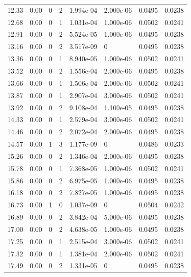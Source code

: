 \documentclass[preview]{standalone}
\begin{document}
{{{\begin{tabular}{L{1.2cm}C{1.2cm} C{0.3cm}C{0.5cm} C{1.4cm}C{1.4cm} C{1.4cm}C{1.4cm}}
  12.33  &  0.00  & 0     &  2 &  1.994e-04  & 2.000e-06  & 0.0495 &  0.0238   \\ 
  12.68  &  0.00  & 0     &  1 &  1.031e-04  & 1.000e-06  & 0.0502 &  0.0241   \\ 
  12.91  &  0.00  & 0     &  2 &  5.524e-05  & 1.000e-06  & 0.0495 &  0.0238   \\ 
  13.16  &  0.00  & 0     &  2 &  3.517e-09  & 0  & 0.0495 &  0.0238   \\ 
  13.36  &  0.00  & 0     &  1 &  8.940e-05  & 1.000e-06  & 0.0502 &  0.0241   \\ 
  13.52  &  0.00  & 0     &  2 &  1.556e-04  & 2.000e-06  & 0.0495 &  0.0238   \\ 
  13.66  &  0.00  & 0     &  1 &  1.506e-04  & 2.000e-06  & 0.0502 &  0.0241   \\ 
  13.87  &  0.00  & 0     &  1 &  2.907e-04  & 3.000e-06  & 0.0502 &  0.0241   \\ 
  13.92  &  0.00  & 0     &  2 &  9.108e-04  & 1.100e-05  & 0.0495 &  0.0238   \\ 
  14.33  &  0.00  & 0     &  1 &  2.579e-04  & 3.000e-06  & 0.0502 &  0.0241   \\ 
  14.46  &  0.00  & 0     &  2 &  2.072e-04  & 2.000e-06  & 0.0495 &  0.0238   \\ 
  14.57  &  0.00  & 1     &  3 &  1.177e-09  & 0  & 0.0486 &  0.0233   \\ 
  15.26  &  0.00  & 0     &  2 &  1.346e-04  & 2.000e-06  & 0.0495 &  0.0238   \\ 
  15.78  &  0.00  & 0     &  1 &  7.368e-05  & 1.000e-06  & 0.0502 &  0.0241   \\ 
  15.86  &  0.00  & 0     &  2 &  6.975e-05  & 1.000e-06  & 0.0495 &  0.0238   \\ 
  16.18  &  0.00  & 0     &  2 &  7.827e-05  & 1.000e-06  & 0.0495 &  0.0238   \\ 
  16.73  &  0.00  & 1     &  0 &  1.037e-09  & 0  & 0.0504 &  0.0242   \\ 
  16.89  &  0.00  & 0     &  2 &  3.842e-04  & 5.000e-06  & 0.0495 &  0.0238   \\ 
  17.00  &  0.00  & 0     &  2 &  4.638e-05  & 1.000e-06  & 0.0495 &  0.0238   \\ 
  17.25  &  0.00  & 0     &  1 &  2.515e-04  & 3.000e-06  & 0.0502 &  0.0241   \\ 
  17.32  &  0.00  & 0     &  1 &  1.381e-04  & 2.000e-06  & 0.0502 &  0.0241   \\ 
  17.49  &  0.00  & 0     &  2 &  1.331e-05  & 0  & 0.0495 &  0.0238   \\ 

\end{tabular}}}}
\end{document}
